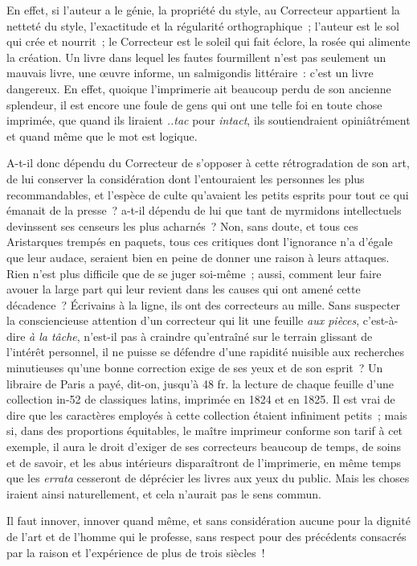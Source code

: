 \documentclass[french,twoside]{book} %
\begin{document}
En effet, si l’auteur a le génie, la propriété du style, au Correcteur appartient la netteté du style, l’exactitude et la régularité orthographique ; l’auteur est le sol qui crée et nourrit ; le Correcteur est le soleil qui fait éclore, la rosée qui alimente la création. Un livre dans lequel les fautes fourmillent  n’est pas seulement un mauvais livre, une œuvre informe, un salmigondis littéraire : c’est un livre dangereux. En effet, quoique l’imprimerie ait beaucoup perdu de son ancienne splendeur, il est encore une foule de gens qui ont une telle foi en toute chose imprimée, que quand ils liraient \emph{..tac} pour \emph{intact}, ils soutiendraient opiniâtrément et quand même que le mot est logique.\par
A-t-il donc dépendu du Correcteur de s’opposer à cette rétrogradation de son art, de lui conserver la considération dont l’entouraient les personnes les plus recommandables, et l’espèce de culte qu’avaient les petits esprits pour tout ce qui émanait de la presse ? a-t-il dépendu de lui que tant de myrmidons intellectuels devinssent ses censeurs les plus acharnés ? Non, sans doute, et tous ces Aristarques trempés en paquets, tous ces critiques dont l’ignorance n’a d’égale que leur audace, seraient bien en peine  de donner une raison à leurs attaques. Rien n’est plus difficile que de se juger soi-même ; aussi, comment leur faire avouer la large part qui leur revient dans les causes qui ont amené cette décadence ? Écrivains à la ligne, ils ont des correcteurs au mille. Sans suspecter la consciencieuse attention d’un correcteur qui lit une feuille \emph{aux pièces}, c’est-à-dire \emph{à la tâche}, n’est-il pas à craindre qu’entraîné sur le terrain glissant de l’intérêt personnel, il ne puisse se défendre d’une rapidité nuisible aux recherches minutieuses qu’une bonne correction exige de ses yeux et de son esprit ? Un libraire de Paris a payé, dit-on, jusqu’à 48 fr. la lecture de chaque feuille d’une collection in-52 de classiques latins, imprimée en 1824 et en 1825. Il est vrai de dire que les caractères employés à cette collection étaient infiniment petits ; mais si, dans des proportions équitables, le maître imprimeur conforme son tarif à cet exemple,  il aura le droit d’exiger de ses correcteurs beaucoup de temps, de soins et de savoir, et les abus intérieurs disparaîtront de l’imprimerie, en même temps que les \emph{errata} cesseront de déprécier les livres aux yeux du public. Mais les choses iraient ainsi naturellement, et cela n’aurait pas le sens commun.\par
Il faut innover, innover quand même, et sans considération aucune pour la dignité de l’art et de l’homme qui le professe, sans respect pour des précédents consacrés par la raison et l’expérience de plus de trois siècles !\par
\end{document}
